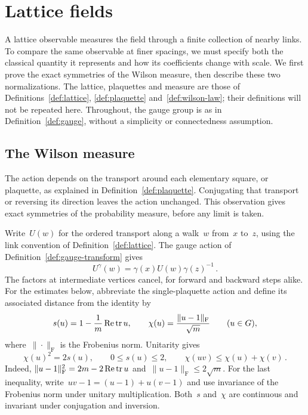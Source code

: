 \section{Lattice fields}\label{sec:uv-lattice}

A lattice observable measures the field through a finite collection of nearby links.
To compare the same observable at finer spacings, we must specify both the classical quantity it represents and how its coefficients change with scale.
We first prove the exact symmetries of the Wilson measure, then describe these two normalizations.
The lattice, plaquettes and measure are those of Definitions~\ref{def:lattice}, \ref{def:plaquette} and~\ref{def:wilson-law}; their definitions will not be repeated here.
Throughout, the gauge group is as in Definition~\ref{def:gauge}, without a simplicity or connectedness assumption.

\subsection{The Wilson measure}

The action depends on the transport around each elementary square, or plaquette, as explained in Definition~\ref{def:plaquette}.
Conjugating that transport or reversing its direction leaves the action unchanged.
This observation gives exact symmetries of the probability measure, before any limit is taken.

Write~$U(w)$ for the ordered transport along a walk~$w$ from~$x$ to~$z$, using the link convention of Definition~\ref{def:lattice}.
The gauge action of Definition~\ref{def:gauge-transform} gives
\begin{equation}\label{eq:uv-gauge}
 U^\gamma(w)=\gamma(x)U(w)\gamma(z)^{-1}\,.
\end{equation}
The factors at intermediate vertices cancel, for forward and backward steps alike.
For the estimates below, abbreviate the single-plaquette action and define its associated distance from the identity by
\begin{equation}\label{eq:uv-chord}
 s(u)=1-\frac{1}{m}\operatorname{Re}\operatorname{tr} u,
 \qquad \chi(u)=\frac{\|u-1\|_{\mathrm F}}{\sqrt m}\qquad(u\in G),
\end{equation}
where~$\|\cdot\|_{\mathrm F}$ is the Frobenius norm.
Unitarity gives
\begin{equation}\label{eq:uv-chord-square}
 \chi(u)^2=2s(u),\qquad 0\le s(u)\le2,\qquad
 \chi(uv)\le\chi(u)+\chi(v)\,.
\end{equation}
Indeed, $\|u-1\|_{\mathrm F}^2=2m-2\operatorname{Re}\operatorname{tr} u$ and~$\|u-1\|_{\mathrm F}\le2\sqrt m$.
For the last inequality, write~$uv-1=(u-1)+u(v-1)$ and use invariance of the Frobenius norm under unitary multiplication.
Both~$s$ and~$\chi$ are continuous and invariant under conjugation and inversion.

